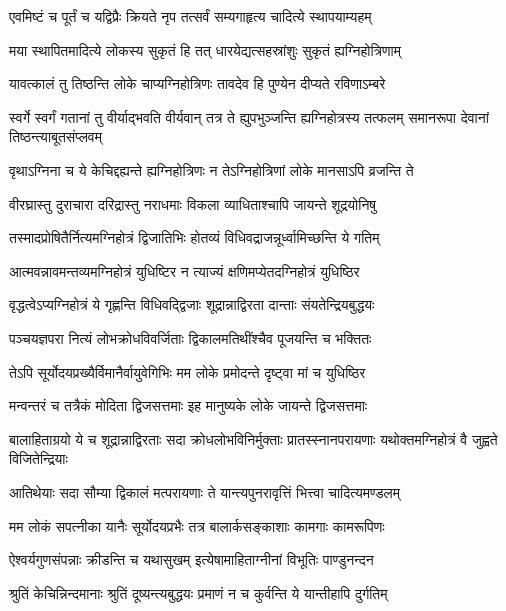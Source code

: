 \twolineshloka
{एवमिष्टं च पूर्तं च यद्विप्रैः क्रियते नृप}
{तत्सर्वं सम्यगाहृत्य चादित्ये स्थापयाम्यहम्}


\twolineshloka
{मया स्थापितमादित्ये लोकस्य सुकृतं हि तत्}
{धारयेद्यत्सहस्रांशुः सुकृतं ह्यग्निहोत्रिणाम्}


\twolineshloka
{यावत्कालं तु तिष्ठन्ति लोके चाप्यग्निहोत्रिणः}
{तावदेव हि पुण्येन दीप्यते रविणाऽम्बरे}


\threelineshloka
{स्वर्गे स्वर्गं गतानां तु वीर्याद्भवति वीर्यवान्}
{तत्र ते ह्युपभुञ्जन्ति ह्यग्निहोत्रस्य तत्फलम्}
{समानरूपा देवानां तिष्ठन्त्याबूतसंप्लवम्}


\twolineshloka
{वृथाऽग्निना च ये केचिद्दह्यन्ते ह्यग्निहोत्रिणः}
{न तेऽग्निहोत्रिणां लोके मानसाऽपि व्रजन्ति ते}


\twolineshloka
{वीरघ्रास्तु दुराचारा दरिद्रास्तु नराधमाः}
{विकला व्याधिताश्चापि जायन्ते शूद्रयोनिषु}


\twolineshloka
{तस्मादप्रोषितैर्नित्यमग्निहोत्रं द्विजातिभिः}
{होतव्यं विधिवद्राजन्नूर्ध्वामिच्छन्ति ये गतिम्}


\twolineshloka
{आत्मवन्नावमन्तव्यमग्निहोत्रं युधिष्टिर}
{न त्याज्यं क्षणिमप्येतदग्निहोत्रं युधिष्ठिर}


\twolineshloka
{वृद्धत्वेऽप्यग्निहोत्रं ये गृह्णन्ति विधिवद्द्विजाः}
{शूद्रान्नाद्विरता दान्ताः संयतेन्द्रियबुद्धयः}


\twolineshloka
{पञ्चयज्ञपरा नित्यं लोभक्रोधविवर्जिताः}
{द्विकालमतिथींश्चैव पूजयन्ति च भक्तितः}


\twolineshloka
{तेऽपि सूर्योदयप्रख्यैर्विमानैर्वायुवेगिभिः}
{मम लोके प्रमोदन्ते दृष्ट्वा मां च युधिष्ठिर}


\twolineshloka
{मन्वन्तरं च तत्रैकं मोदिता द्विजसत्तमाः}
{इह मानुष्यके लोके जायन्ते द्विजसत्तमाः}


\threelineshloka
{बालाहिताग्रयो ये च शूद्रान्नाद्विरताः सदा}
{क्रोधलोभविनिर्मुक्ताः प्रातस्स्नानपरायणाः}
{यथोक्तमग्निहोत्रं वै जुह्वते विजितेन्द्रियाः}


\twolineshloka
{आतिथेयाः सदा सौम्या द्विकालं मत्परायणाः}
{ते यान्त्यपुनरावृत्तिं भित्त्वा चादित्यमण्डलम्}


\twolineshloka
{मम लोकं सपत्नीका यानैः सूर्योदयप्रभैः}
{तत्र बालार्कसङ्काशाः कामगाः कामरूपिणः}


\twolineshloka
{ऐश्वर्यगुणसंपन्नाः क्रीडन्ति च यथासुखम्}
{इत्येषामाहिताग्नीनां विभूतिः पाण्डुनन्दन}


\threelineshloka
{श्रुतिं केचिन्निन्दमानाः श्रुतिं दूष्यन्त्यबुद्धयः}
{प्रमाणं न च कुर्वन्ति ये यान्तीहापि दुर्गतिम्}
{}


